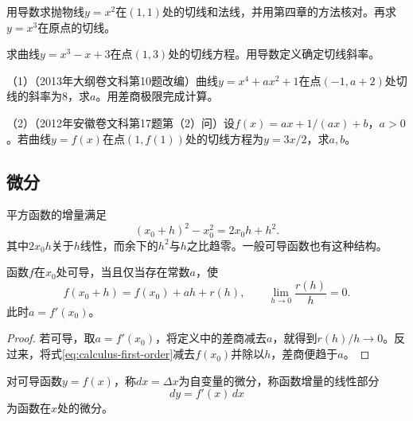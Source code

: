 \begin{example}
用导数求抛物线\(y=x^2\)在\((1,1)\)处的切线和法线，并用第四章的方法核对。再求\(y=x^3\)在原点的切线。
\end{example}

\begin{example}[2012年广东卷理科第12题]
\label{ex:calculus-gaokao-polynomial-tangent}
求曲线\(y=x^3-x+3\)在点\((1,3)\)处的切线方程。用导数定义确定切线斜率。
\end{example}

\begin{exercise}
\mbox{}\par\nobreak

（1）（2013年大纲卷文科第10题改编）曲线\(y=x^4+ax^2+1\)在点\((-1,a+2)\)处切线的斜率为\(8\)，求\(a\)。用差商极限完成计算。

（2）（2012年安徽卷文科第17题第（2）问）设\(f(x)=ax+1/(ax)+b\)，\(a>0\)。若曲线\(y=f(x)\)在点\((1,f(1))\)处的切线方程为\(y=3x/2\)，求\(a,b\)。
\end{exercise}

\subsection{微分}
\label{subsec:calculus-differential}

平方函数的增量满足
\begin{equation*}
 (x_0+h)^2-x_0^2=2x_0h+h^2.
\end{equation*}
其中\(2x_0h\)关于\(h\)线性，而余下的\(h^2\)与\(h\)之比趋零。一般可导函数也有这种结构。

\begin{proposition}\label{prop:calculus-first-order}
函数\(f\)在\(x_0\)处可导，当且仅当存在常数\(a\)，使
\begin{equation}\label{eq:calculus-first-order}
 f(x_0+h)=f(x_0)+ah+r(h),\qquad \lim_{h\to0}\frac{r(h)}h=0.
\end{equation}
此时\(a=f'(x_0)\)。
\end{proposition}

\begin{proof}
若可导，取\(a=f'(x_0)\)，将定义中的差商减去\(a\)，就得到\(r(h)/h\to0\)。反过来，将式\eqref{eq:calculus-first-order}减去\(f(x_0)\)并除以\(h\)，差商便趋于\(a\)。
\end{proof}

\begin{definition}
对可导函数\(y=f(x)\)，称\(dx=\Delta x\)为自变量的微分，称函数增量的线性部分
\begin{equation*}
 dy=f'(x)\,dx
\end{equation*}
为函数在\(x\)处的{\heiti{}微分}。
\end{definition}

